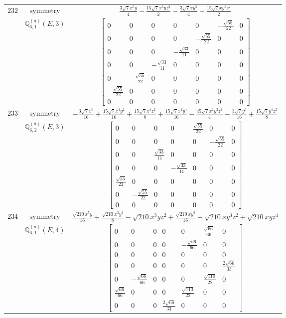 \documentclass[fleqn,8pt,landscape]{jsarticle}
\begin{document}
\begin{longtable}{ccc}
$ 232 $ & $ \text{symmetry} $ & $ \frac{3 \sqrt{7} x^{5} y}{4} - \frac{15 \sqrt{7} x^{3} y z^{2}}{2} - \frac{3 \sqrt{7} x y^{5}}{4} + \frac{15 \sqrt{7} x y^{3} z^{2}}{2} $ \\
$  $ & $ \mathbb{Q}_{6,1}^{(a)}(E,3) $ & $ \begin{bmatrix} 0 & 0 & 0 & 0 & 0 & - \frac{\sqrt{55}}{22} & 0 \\ 0 & 0 & 0 & 0 & - \frac{\sqrt{55}}{22} & 0 & 0 \\ 0 & 0 & 0 & - \frac{\sqrt{33}}{11} & 0 & 0 & 0 \\ 0 & 0 & - \frac{\sqrt{33}}{11} & 0 & 0 & 0 & 0 \\ 0 & - \frac{\sqrt{55}}{22} & 0 & 0 & 0 & 0 & 0 \\ - \frac{\sqrt{55}}{22} & 0 & 0 & 0 & 0 & 0 & 0 \\ 0 & 0 & 0 & 0 & 0 & 0 & 0 \end{bmatrix} $ \\ \hline
$ 233 $ & $ \text{symmetry} $ & $ - \frac{3 \sqrt{7} x^{6}}{16} + \frac{15 \sqrt{7} x^{4} y^{2}}{16} + \frac{15 \sqrt{7} x^{4} z^{2}}{8} + \frac{15 \sqrt{7} x^{2} y^{4}}{16} - \frac{45 \sqrt{7} x^{2} y^{2} z^{2}}{4} - \frac{3 \sqrt{7} y^{6}}{16} + \frac{15 \sqrt{7} y^{4} z^{2}}{8} $ \\
$  $ & $ \mathbb{Q}_{6,2}^{(a)}(E,3) $ & $ \begin{bmatrix} 0 & 0 & 0 & 0 & \frac{\sqrt{55}}{22} & 0 & 0 \\ 0 & 0 & 0 & 0 & 0 & - \frac{\sqrt{55}}{22} & 0 \\ 0 & 0 & \frac{\sqrt{33}}{11} & 0 & 0 & 0 & 0 \\ 0 & 0 & 0 & - \frac{\sqrt{33}}{11} & 0 & 0 & 0 \\ \frac{\sqrt{55}}{22} & 0 & 0 & 0 & 0 & 0 & 0 \\ 0 & - \frac{\sqrt{55}}{22} & 0 & 0 & 0 & 0 & 0 \\ 0 & 0 & 0 & 0 & 0 & 0 & 0 \end{bmatrix} $ \\ \hline
$ 234 $ & $ \text{symmetry} $ & $ \frac{\sqrt{210} x^{5} y}{16} + \frac{\sqrt{210} x^{3} y^{3}}{8} - \sqrt{210} x^{3} y z^{2} + \frac{\sqrt{210} x y^{5}}{16} - \sqrt{210} x y^{3} z^{2} + \sqrt{210} x y z^{4} $ \\
$  $ & $ \mathbb{Q}_{6,1}^{(a)}(E,4) $ & $ \begin{bmatrix} 0 & 0 & 0 & 0 & 0 & \frac{\sqrt{66}}{66} & 0 \\ 0 & 0 & 0 & 0 & - \frac{\sqrt{66}}{66} & 0 & 0 \\ 0 & 0 & 0 & 0 & 0 & 0 & 0 \\ 0 & 0 & 0 & 0 & 0 & 0 & \frac{2 \sqrt{66}}{33} \\ 0 & - \frac{\sqrt{66}}{66} & 0 & 0 & 0 & \frac{\sqrt{110}}{22} & 0 \\ \frac{\sqrt{66}}{66} & 0 & 0 & 0 & \frac{\sqrt{110}}{22} & 0 & 0 \\ 0 & 0 & 0 & \frac{2 \sqrt{66}}{33} & 0 & 0 & 0 \end{bmatrix} $ \\ \hline

\end{longtable}
\end{document}
